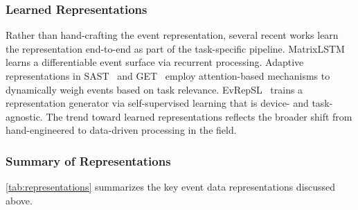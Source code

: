\subsubsection{Learned Representations}
\label{sec:repr_learned}

Rather than hand-crafting the event representation, several recent works learn the representation end-to-end as part of the task-specific pipeline. MatrixLSTM~\cite{cannici2020matrixlstm} learns a differentiable event surface via recurrent processing. Adaptive representations in SAST~\cite{peng2024sast} and GET~\cite{peng2023get} employ attention-based mechanisms to dynamically weigh events based on task relevance. EvRepSL~\cite{kang2024evrepsl} trains a representation generator via self-supervised learning that is device- and task-agnostic. The trend toward learned representations reflects the broader shift from hand-engineered to data-driven processing in the field.


\subsubsection{Summary of Representations}
\label{sec:repr_summary}

\cref{tab:representations} summarizes the key event data representations discussed above.

\begin{table}[t]
\centering
\caption{Comparison of event data representations. \textbf{CNN}: compatible with standard CNNs; \textbf{Temp.}: temporal fidelity (how much temporal information is preserved); \textbf{Async.}: supports asynchronous, per-event processing.}
\label{tab:representations}
\end{table}


